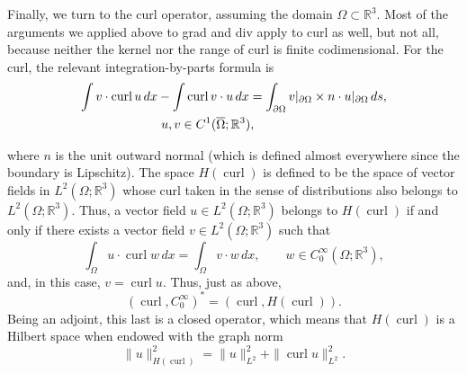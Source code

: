 {Finally, we turn to the curl operator, assuming the domain $\Omega\subset\mathbb R^3$. Most of the arguments we applied above to grad and div apply to curl as well, but not all, because neither the kernel nor the range of curl is finite codimensional. For the curl, the relevant integration-by-parts formula is}
\begin{equation}\label{eq:curl-classical-green}
\begin{aligned}
\int v\cdot\operatorname{curl}u\,dx-\int\operatorname{curl}v\cdot u\,dx&=\int_{\partial\Omega}v|_{\partial\Omega}\times n\cdot u|_{\partial\Omega}\,ds,\\
&\hspace{-7em}u,v\in C^1(\overline\Omega;\mathbb R^3),
\end{aligned}
\end{equation}

{where $n$ is the unit outward normal (which is defined almost everywhere since the boundary is Lipschitz). The space $H(\operatorname{curl})$ is defined to be the space of vector fields in $L^2(\Omega;\mathbb R^3)$ whose curl taken in the sense of distributions also belongs to $L^2(\Omega;\mathbb R^3)$. Thus, a vector field $u\in L^2(\Omega;\mathbb R^3)$ belongs to $H(\operatorname{curl})$ if and only if there exists a vector field $v\in L^2(\Omega;\mathbb R^3)$ such that}
\begin{equation}\label{eq:distributional-curl}
\int_\Omega u\cdot\operatorname{curl}w\,dx=\int_\Omega v\cdot w\,dx,\qquad w\in C_0^\infty(\Omega;\mathbb R^3),
\end{equation}
{and, in this case, $v=\operatorname{curl}u$. Thus, just as above,}
\[
(\operatorname{curl},C_0^\infty)^*=(\operatorname{curl},H(\operatorname{curl})).
\]
{Being an adjoint, this last is a closed operator, which means that $H(\operatorname{curl})$ is a Hilbert space when endowed with the graph norm}
\[
\|u\|_{H(\operatorname{curl})}^2=\|u\|_{L^2}^2+\|\operatorname{curl}u\|_{L^2}^2.
\]


